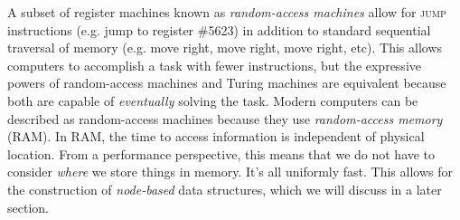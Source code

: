 A subset of register machines known as \textit{random-access machines} allow for \textsc{jump} instructions (e.g. jump to register \#5623) in addition to standard sequential traversal of memory (e.g. move right, move right, move right, etc). This allows computers to accomplish a task with fewer instructions, but the expressive powers of random-access machines and Turing machines are equivalent because both are capable of \textit{eventually} solving the task. Modern computers can be described as random-access machines because they use \textit{random-access memory} (RAM). In RAM, the time to access information is independent of physical location. From a performance perspective, this means that we do not have to consider \textit{where} we store things in memory. It's all uniformly fast. This allows for the construction of \textit{node-based} data structures, which we will discuss in a later section. \\\\


